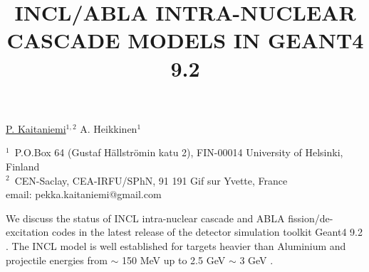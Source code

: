 \documentclass[12pt]{article}
\begin{document}
\title{INCL/ABLA INTRA-NUCLEAR CASCADE MODELS IN GEANT4 9.2}


\underline{P. Kaitaniemi}$^{1, 2}$ A. Heikkinen$^1$ 

$^1$~P.O.Box 64 (Gustaf H\"allstr\"omin katu 2), FIN-00014 University of Helsinki, Finland\\
$^2$~CEN-Saclay, CEA-IRFU/SPhN, 91 191 Gif sur Yvette, France\\
email: pekka.kaitaniemi@gmail.com



We discuss the status of INCL intra-nuclear cascade and ABLA fission/de-excitation codes
in the latest release of the detector simulation toolkit Geant4 9.2 \cite{pk09aCollaboration}.
The INCL model is well established for targets heavier than Aluminium
and projectile energies from $\sim$ 150 MeV up to 2.5 GeV $\sim$ 3 GeV \cite{pk08bProceedings}. 

\end{document}

